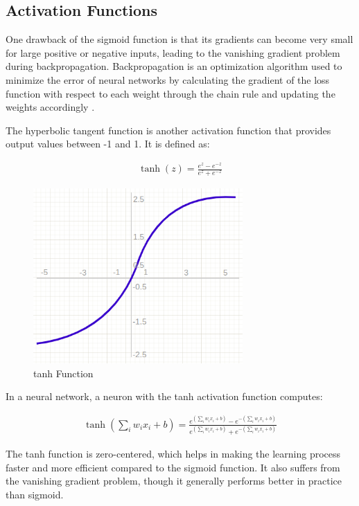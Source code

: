 \subsection{Activation Functions}

One drawback of the sigmoid function is that its gradients can become very small for large positive or negative inputs, leading to the vanishing gradient problem during backpropagation.
Backpropagation is an optimization algorithm used to minimize the error of neural networks by calculating the gradient of the loss function with respect to each weight through the chain rule and updating the weights accordingly\cite{KELLEY_1960} \cite{Bryson_1962} .

The hyperbolic tangent function is another activation function that provides output values between -1 and 1.
It is defined as:

\begin{align}
  \tanh(z) = \frac{e^z - e^{-z}}{e^z + e^{-z}}
\end{align}

\begin{figure}[H]
  \centering
  \includegraphics[width=80mm]{figures/tanh.png}
  \caption{tanh Function \cite{Potrimba_2023}}
  \label{tanh}
\end{figure}

In a neural network, a neuron with the tanh activation function computes:

\begin{align}
  \tanh(\sum_i w_i x_i + b) = \frac{e^{(\sum_i w_i x_i + b)} - e^{-(\sum_i w_i x_i + b)}}{e^{(\sum_i w_i x_i + b)} + e^{-(\sum_i w_i x_i + b)}}
\end{align}

The tanh function is zero-centered, which helps in making the learning process faster and more efficient compared to the sigmoid function.
It also suffers from the vanishing gradient problem, though it generally performs better in practice than sigmoid.

